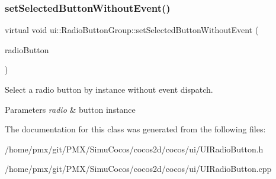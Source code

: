 \subsubsection{\texorpdfstring{set\+Selected\+Button\+Without\+Event()}{setSelectedButtonWithoutEvent()}\hspace{0.1cm}{\footnotesize\ttfamily [4/4]}}
{\footnotesize\ttfamily virtual void ui\+::\+Radio\+Button\+Group\+::set\+Selected\+Button\+Without\+Event (\begin{DoxyParamCaption}\item[{\hyperlink{classui_1_1RadioButton}{Radio\+Button} $\ast$}]{radio\+Button }\end{DoxyParamCaption})\hspace{0.3cm}{\ttfamily [virtual]}}

Select a radio button by instance without event dispatch.


\begin{DoxyParams}{Parameters}
{\em radio} & button instance \\
\hline
\end{DoxyParams}


The documentation for this class was generated from the following files\+:\begin{DoxyCompactItemize}
\item 
/home/pmx/git/\+P\+M\+X/\+Simu\+Cocos/cocos2d/cocos/ui/U\+I\+Radio\+Button.\+h\item 
/home/pmx/git/\+P\+M\+X/\+Simu\+Cocos/cocos2d/cocos/ui/U\+I\+Radio\+Button.\+cpp\end{DoxyCompactItemize}
